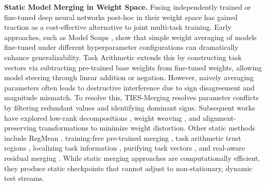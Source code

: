 \documentclass{article}
\theoremstyle{plain}
\theoremstyle{definition}
\theoremstyle{remark}
\begin{document}
\textbf{Static Model Merging in Weight Space.} Fusing independently trained or fine-tuned deep neural networks post-hoc in their weight space has gained traction as a cost-effective alternative to joint multi-task training. Early approaches, such as Model Soups \cite{modelsoups}, show that simple weight averaging of models fine-tuned under different hyperparameter configurations can dramatically enhance generalizability. Task Arithmetic \cite{taskarithmetic} extends this by constructing task vectors via subtracting pre-trained base weights from fine-tuned weights, allowing model steering through linear addition or negation. However, naively averaging parameters often leads to destructive interference due to sign disagreement and magnitude mismatch. To resolve this, TIES-Merging \cite{tiesmerging, tiesmergingresolvinginterferencewhen2023} resolves parameter conflicts by filtering redundant values and identifying dominant signs. 
Subsequent works have explored low-rank decompositions \cite{accurateefficientlowrankmodel2025}, weight weaving \cite{weightweavingparameterpooling2025}, and alignment-preserving transformations \cite{alignmergealignmentpreservinglargelanguage2025} to minimize weight distortion. 
Other static methods include RegMean \cite{rethinkingweightaveragedmodelmerging2024}, training-free pre-trained merging \cite{trainingfreepretrainedmodelmerging2024}, task arithmetic trust regions \cite{taskarithmetictrustregion2025}, localizing task information \cite{localizingtaskinformationimproved2024}, purifying task vectors \cite{purifyingtaskvectorsknowledgeaware2025}, and real-aware residual merging \cite{realawareresidualmodelmerging2025}. While static merging approaches are computationally efficient, they produce static checkpoints that cannot adjust to non-stationary, dynamic test streams.
\end{document}
